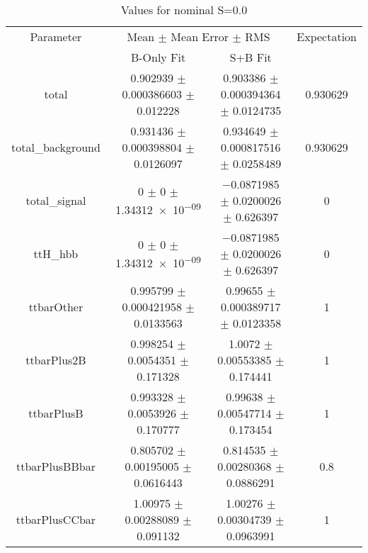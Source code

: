 \begin{table}
\centering
\caption{Values for nominal S=0.0}
\begin{tabular}{cccc}
\toprule
Parameter & \multicolumn{2}{c}{Mean $\pm$ Mean Error $\pm$ RMS} & Expectation\\
 & B-Only Fit & S+B Fit & \\
\midrule
total & \num{0.902939} $\pm$ \num{0.000386603} $\pm$ \num{0.012228} & \num{0.903386} $\pm$ \num{0.000394364} $\pm$ \num{0.0124735} & \num{0.930629}\\
total\_background & \num{0.931436} $\pm$ \num{0.000398804} $\pm$ \num{0.0126097} & \num{0.934649} $\pm$ \num{0.000817516} $\pm$ \num{0.0258489} & \num{0.930629}\\
total\_signal & \num{0} $\pm$ \num{0} $\pm$ \num{1.34312e-09} & \num{-0.0871985} $\pm$ \num{0.0200026} $\pm$ \num{0.626397} & \num{0}\\
ttH\_hbb & \num{0} $\pm$ \num{0} $\pm$ \num{1.34312e-09} & \num{-0.0871985} $\pm$ \num{0.0200026} $\pm$ \num{0.626397} & \num{0}\\
ttbarOther & \num{0.995799} $\pm$ \num{0.000421958} $\pm$ \num{0.0133563} & \num{0.99655} $\pm$ \num{0.000389717} $\pm$ \num{0.0123358} & \num{1}\\
ttbarPlus2B & \num{0.998254} $\pm$ \num{0.0054351} $\pm$ \num{0.171328} & \num{1.0072} $\pm$ \num{0.00553385} $\pm$ \num{0.174441} & \num{1}\\
ttbarPlusB & \num{0.993328} $\pm$ \num{0.0053926} $\pm$ \num{0.170777} & \num{0.99638} $\pm$ \num{0.00547714} $\pm$ \num{0.173454} & \num{1}\\
ttbarPlusBBbar & \num{0.805702} $\pm$ \num{0.00195005} $\pm$ \num{0.0616443} & \num{0.814535} $\pm$ \num{0.00280368} $\pm$ \num{0.0886291} & \num{0.8}\\
ttbarPlusCCbar & \num{1.00975} $\pm$ \num{0.00288089} $\pm$ \num{0.091132} & \num{1.00276} $\pm$ \num{0.00304739} $\pm$ \num{0.0963991} & \num{1}\\
\bottomrule
\end{tabular}
\end{table}